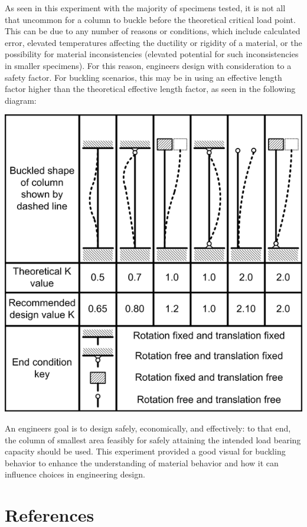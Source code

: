 \documentclass{article}
\begin{document}
    \indent As seen in this experiment with the majority of specimens tested, it is not all that uncommon for a column to buckle before the theoretical critical load point. This can be due to any number of reasons or conditions, which include calculated error, elevated temperatures affecting the ductility or rigidity of a material, or the possibility for material inconsistencies (elevated potential for such inconsistencies in smaller specimens). For this reason, engineers design with consideration to a safety factor. For buckling scenarios, this may be in using an effective length factor higher than the theoretical effective length factor, as seen in the following diagram:\\

    \begin{center}
    \includegraphics[scale=0.3]{pic.png}
    \end{center}

    \indent An engineers goal is to design safely, economically, and effectively: to that end, the column of smallest area feasibly for safely attaining the intended load bearing capacity should be used. This experiment provided a good visual for buckling behavior to enhance the understanding of    material behavior and how it can influence choices in engineering design.
    \newpage
    \section{References}
    
\end{document}
